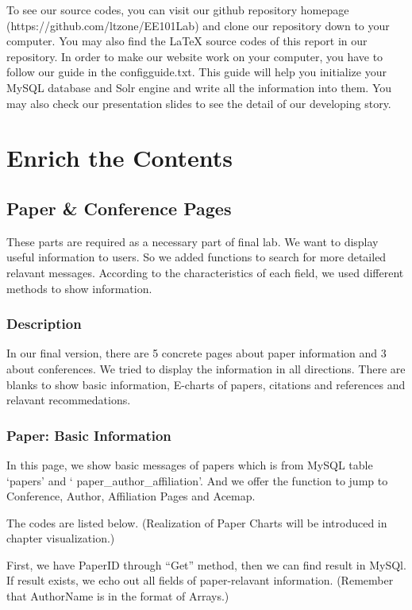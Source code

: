 \documentclass{book}
\begin{document}
To see our source codes, you can visit our github repository homepage (https://github.com/ltzone/EE101Lab) and clone our repository down to your computer. You may also find the LaTeX source codes of this report in our repository. In order to make our website work on your computer, you have to follow our guide in the configguide.txt. This guide will help you initialize your MySQL database and Solr engine and write all the information into them. You may also check our presentation slides to see the detail of our developing story.



\mainmatter
\chapter {Enrich the Contents}

\section {Paper \& Conference Pages}

These parts are required as a necessary part of final lab. We want to display useful information to users. So we added functions to search for more detailed relavant messages. According to the characteristics of each field, we used different methods to show information.


\subsection{Description}
In our final version, there are 5 concrete pages about paper information and 3 about conferences. We tried to display the information in all directions. There are blanks to show basic information, E-charts of papers, citations and references and relavant recommedations. 

\subsection{Paper: Basic Information}
In this page, we show basic messages of papers
which is from MySQL table `papers' and ` paper\_author\_affiliation'.
 And we offer the function to jump to Conference, Author, Affiliation Pages and Acemap.


The codes are listed below. (Realization of Paper Charts will be introduced in chapter visualization.)

First, we have PaperID through ``Get'' method, then we can find result in MySQl. If result exists, we echo out all fields of paper-relavant  information. (Remember that  AuthorName is in the format of Arrays.)
\end{document}
